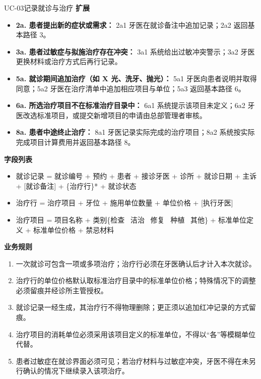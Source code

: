 \documentclass[11pt,a4paper]{ctexart}
\begin{document}
\begin{ucbox}{UC-03\quad 记录就诊与治疗}
\vspace{2pt}
\textbf{扩展}
\begin{itemize}[leftmargin=1.4em,topsep=2pt,itemsep=1pt]
  \item \textbf{2a. 患者提出新的症状或需求：} 2a1 牙医在就诊备注中追加记录；2a2 返回基本路径 3。
  \item \textbf{3a. 患者过敏症与拟施治疗存在冲突：} 3a1 系统给出过敏冲突警示；3a2 牙医更换材料或治疗方式后再行记录。
  \item \textbf{5a. 就诊期间追加治疗（如 X 光、洗牙、抛光）：} 5a1 牙医向患者说明并取得同意；5a2 牙医在治疗清单中追加相应项目与单位；5a3 返回基本路径 6。
  \item \textbf{6a. 所选治疗项目不在标准治疗目录中：} 6a1 系统提示该项目未定义；6a2 牙医改选标准项目，或提交新增项目的申请由总部管理者审核。
  \item \textbf{8a. 患者中途终止治疗：} 8a1 牙医记录实际完成的治疗项目；8a2 系统按实际完成项目计算费用并返回基本路径 8。
\end{itemize}

\vspace{2pt}
\textbf{字段列表}
\begin{itemize}[leftmargin=1.4em,topsep=2pt,itemsep=1pt]
  \item 就诊记录 = 就诊编号 + 预约 + 患者 + 接诊牙医 + 诊所 + 就诊日期 + 主诉 + [就诊备注] + \{治疗行\}* + 就诊状态
  \item 治疗行 = 治疗项目 + 牙位 + 施用单位数量 + 单位价格 + [执行牙医]
  \item 治疗项目 = 项目名称 + 类别\{检查 \textbar\ 洁治 \textbar\ 修复 \textbar\ 种植 \textbar\ 其他\} + 标准单位定义 + 标准单位价格 + 禁忌材料
\end{itemize}

\vspace{2pt}
\textbf{业务规则}
\begin{enumerate}[leftmargin=1.9em,topsep=2pt,itemsep=1pt]
  \item 一次就诊可包含一项或多项治疗；治疗行必须在牙医确认后才计入本次就诊。
  \item 治疗行的单位价格默认取标准治疗目录中的标准单位价格；特殊情况下的调整必须留痕并经诊所主管授权。
  \item 就诊记录一经生成，其治疗行不得物理删除；更正须以追加红冲记录的方式留痕。
  \item 治疗项目的消耗单位必须采用该项目定义的标准单位，不得以“各”等模糊单位代替。
  \item 患者过敏症在就诊界面必须可见；若治疗材料与过敏症冲突，牙医不得在未另行确认的情况下继续录入该项治疗。
\end{enumerate}


\end{ucbox}
\end{document}
